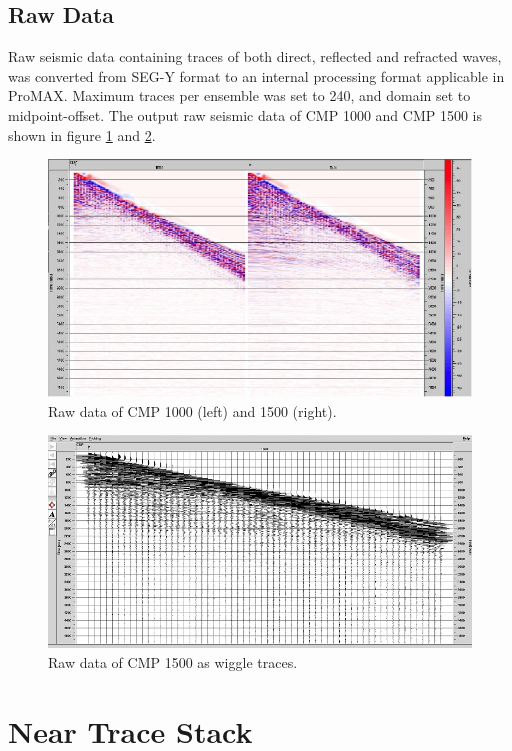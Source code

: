 \documentclass[10pt,a4paper]{article}
\begin{document}
\subsection{Raw Data}

Raw seismic data containing traces of both direct, reflected and refracted waves, was converted from SEG-Y format to an internal processing format applicable in ProMAX. Maximum traces per ensemble was set to 240, and domain set to midpoint-offset. The output raw seismic data of CMP 1000 and CMP 1500 is shown in figure \ref{fig2} and \ref{rawWiggle}.

\begin{figure}[H]
\includegraphics[width=\textwidth]{fig2.jpg}
\caption{Raw data of CMP 1000 (left) and 1500 (right).}
\label{fig2}
\end{figure}

\begin{figure}[H]
\includegraphics[width=\textwidth]{rawWiggle.jpg}
\caption{Raw data of CMP 1500 as wiggle traces.}
\label{rawWiggle}
\end{figure}

\newpage

\section{Near Trace Stack}
\end{document}
